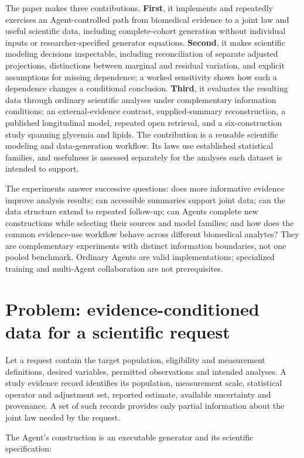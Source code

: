 \documentclass[10pt,twocolumn]{article}
\begin{document}
The paper makes three contributions. \textbf{First}, it implements and repeatedly exercises an Agent-controlled path from biomedical evidence to a joint law and useful scientific data, including complete-cohort generation without individual inputs or researcher-specified generator equations. \textbf{Second}, it makes scientific modeling decisions inspectable, including reconciliation of separate adjusted projections, distinctions between marginal and residual variation, and explicit assumptions for missing dependence; a worked sensitivity shows how such a dependence changes a conditional conclusion. \textbf{Third}, it evaluates the resulting data through ordinary scientific analyses under complementary information conditions: an external-evidence contrast, supplied-summary reconstruction, a published longitudinal model, repeated open retrieval, and a six-construction study spanning glycemia and lipids. The contribution is a reusable scientific modeling and data-generation workflow. Its laws use established statistical families, and usefulness is assessed separately for the analyses each dataset is intended to support.


The experiments answer successive questions: does more informative evidence improve analysis results; can accessible summaries support joint data; can the data structure extend to repeated follow-up; can Agents complete new constructions while selecting their sources and model families; and how does the common evidence-use workflow behave across different biomedical analytes? They are complementary experiments with distinct information boundaries, not one pooled benchmark. Ordinary Agents are valid implementations; specialized training and multi-Agent collaboration are not prerequisites.


\section{Problem: evidence-conditioned data for a scientific request}

Let a request contain the target population, eligibility and measurement definitions, desired variables, permitted observations and intended analyses. A study evidence record identifies its population, measurement scale, statistical operator and adjustment set, reported estimate, available uncertainty and provenance. A set of such records provides only partial information about the joint law needed by the request.


The Agent's construction is an executable generator and its scientific specification:
\end{document}
